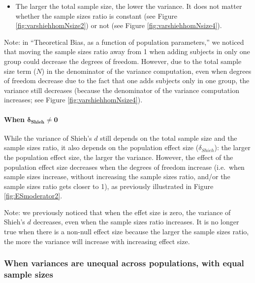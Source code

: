 \documentclass[
  english,
  man,mask]{apa6}
\providecommand{\tightlist}{%
  \setlength{\itemsep}{0pt}\setlength{\parskip}{0pt}}
\let\oldparagraph\paragraph
\renewcommand{\paragraph}[1]{\oldparagraph{#1}\mbox{}}
\begin{document}
\begin{itemize}
\tightlist
\item
  The larger the total sample size, the lower the variance. It does not matter whether the sample sizes ratio is constant (see Figure \ref{fig:varshiehhomNsize2}) or not (see Figure \ref{fig:varshiehhomNsize4}).
\end{itemize}

Note: in ``Theoretical Bias, as a function of population parameters,'' we noticed that moving the sample sizes ratio away from 1 when adding subjects in only one group could decrease the degrees of freedom. However, due to the total sample size term (\(N\)) in the denominator of the variance computation, even when degrees of freedom decrease due to the fact that one adds subjects only in one group, the variance still decreases (because the denominator of the variance computation increases; see Figure \ref{fig:varshiehhomNsize4}).

\hypertarget{when-bmdelta_shieh-neq-0}{%
\paragraph{\texorpdfstring{When \(\bm{\delta_{Shieh} \neq 0}\)}{When \textbackslash bm\{\textbackslash delta\_\{Shieh\} \textbackslash neq 0\}}}\label{when-bmdelta_shieh-neq-0}}

While the variance of Shieh's \(d\) still depends on the total sample size and the sample sizes ratio, it also depends on the population effect size (\(\delta_{Shieh}\)): the larger the population effect size, the larger the variance. However, the effect of the population effect size decreases when the degrees of freedom increase (i.e.~when sample sizes increase, without increasing the sample sizes ratio, and/or the sample sizes ratio gets closer to 1), as previously illustrated in Figure \ref{fig:ESmoderator2}.

Note: we previously noticed that when the effet size is zero, the variance of Shieh's \(d\) decreases, even when the sample sizes ratio increases. It is no longer true when there is a non-null effect size because the larger the sample sizes ratio, the more the variance will increase with increasing effect size.

\hypertarget{when-variances-are-unequal-across-populations-with-equal-sample-sizes-2}{%
\subsubsection{When variances are unequal across populations, with equal sample sizes}\label{when-variances-are-unequal-across-populations-with-equal-sample-sizes-2}}
\end{document}
